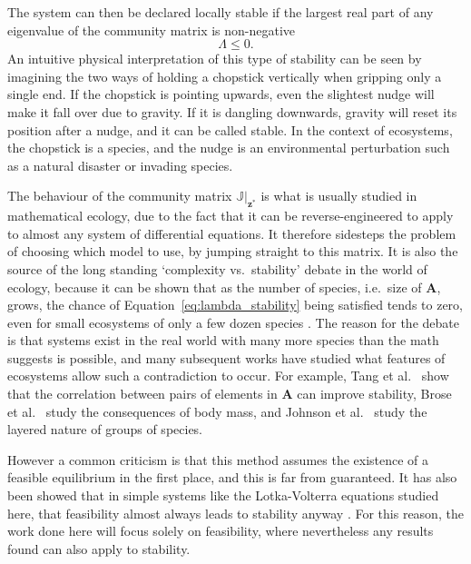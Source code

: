 The system can then be declared locally stable if the largest real part of any eigenvalue of the community matrix is non-negative
\begin{equation}
    \Lambda \leq 0.
    \label{eq:lambda_stability}
\end{equation}
An intuitive physical interpretation of this type of stability can be seen by imagining the two ways of holding a chopstick vertically when gripping only a single end. If the chopstick is pointing upwards, even the slightest nudge will make it fall over due to gravity. If it is dangling downwards, gravity will reset its position after a nudge, and it can be called stable.
In the context of ecosystems, the chopstick is a species, and the nudge is an environmental perturbation such as a natural disaster or invading species.

The behaviour of the community matrix $\mathbb{J}|_\mathbf{z^*}$ is what is usually studied in mathematical ecology, due to the fact that it can be reverse-engineered to apply to almost any system of differential equations. It therefore sidesteps the problem of choosing which model to use, by jumping straight to this matrix.
It is also the source of the long standing `complexity vs.\ stability' debate in the world of ecology, because it can be shown that as the number of species, i.e.\ size of $\mathbf{A}$, grows, the chance of Equation~\eqref{eq:lambda_stability} being satisfied tends to zero, even for small ecosystems of only a few dozen species \cite{May1973}.
The reason for the debate is that systems exist in the real world with many more species than the math suggests is possible, and many subsequent works have studied what features of ecosystems allow such a contradiction to occur.
For example, Tang et al.\ \cite{Tang2014Correlation} show that the correlation between pairs of elements in $\mathbf{A}$ can improve stability, Brose et al.\ \cite{Brose2006} study the consequences of body mass, and Johnson et al.\ \cite{Johnson2014} study the layered nature of groups of species.

However a common criticism is that this method assumes the existence of a feasible equilibrium in the first place, and this is far from guaranteed. It has also been showed that in simple systems like the Lotka-Volterra equations studied here, that feasibility almost always leads to stability anyway \cite{Dougoud2018}. For this reason, the work done here will focus solely on feasibility, where nevertheless any results found can also apply to stability.

